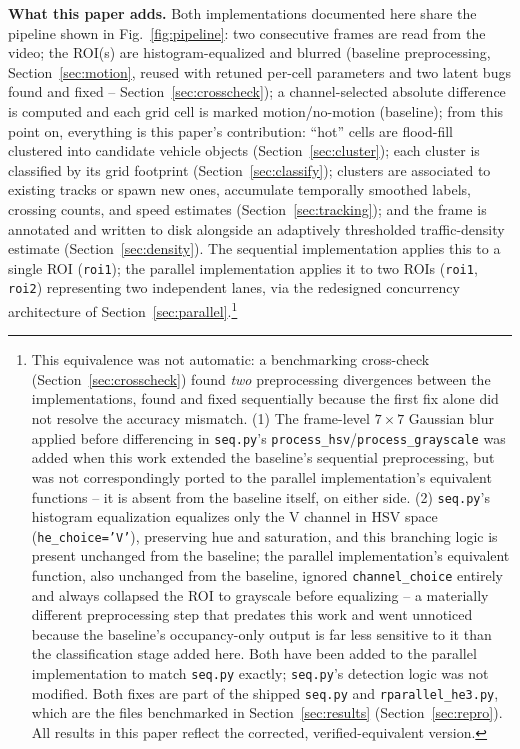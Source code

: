 \documentclass[conference]{IEEEtran}
\newcommand{\code}[1]{\texttt{#1}}
\begin{document}
\textbf{What this paper adds.} Both implementations documented here
share the pipeline shown in Fig.~\ref{fig:pipeline}: two consecutive
frames are read from the video; the ROI(s) are histogram-equalized and
blurred (baseline preprocessing, Section~\ref{sec:motion}, reused with
retuned per-cell parameters and two latent bugs found and fixed --
Section~\ref{sec:crosscheck}); a channel-selected absolute difference is
computed and each grid cell is marked motion/no-motion (baseline); from
this point on, everything is this paper's contribution: ``hot'' cells
are flood-fill clustered into candidate vehicle objects
(Section~\ref{sec:cluster}); each cluster is classified by its grid
footprint (Section~\ref{sec:classify}); clusters are associated to
existing tracks or spawn new ones, accumulate temporally smoothed
labels, crossing counts, and speed estimates (Section~\ref{sec:tracking});
and the frame is annotated and written to disk alongside an adaptively
thresholded traffic-density estimate (Section~\ref{sec:density}). The
sequential implementation applies this to a single ROI (\code{roi1});
the parallel implementation applies it to two ROIs (\code{roi1},
\code{roi2}) representing two independent lanes, via the redesigned
concurrency architecture of Section~\ref{sec:parallel}.\footnote{This
equivalence was not automatic: a benchmarking cross-check
(Section~\ref{sec:crosscheck}) found \emph{two} preprocessing
divergences between the implementations, found and fixed sequentially
because the first fix alone did not resolve the accuracy mismatch. (1)
The frame-level $7\times7$ Gaussian blur applied before differencing in
\code{seq.py}'s \code{process\_hsv}/\code{process\_grayscale} was added
when this work extended the baseline's sequential preprocessing, but
was not correspondingly ported to the parallel implementation's
equivalent functions -- it is absent from the baseline itself, on
either side. (2) \code{seq.py}'s histogram equalization equalizes only
the V channel in HSV space (\code{he\_choice='V'}), preserving hue and
saturation, and this branching logic is present unchanged from the
baseline; the parallel implementation's equivalent function, also
unchanged from the baseline, ignored \code{channel\_choice} entirely and
always collapsed the ROI to grayscale before equalizing -- a materially
different preprocessing step that predates this work and went unnoticed
because the baseline's occupancy-only output is far less sensitive to
it than the classification stage added here. Both have been added to
the parallel implementation to match \code{seq.py} exactly;
\code{seq.py}'s detection logic was not modified. Both fixes are part of
the shipped \code{seq.py} and \code{rparallel\_he3.py}, which are the
files benchmarked in Section~\ref{sec:results} (Section~\ref{sec:repro}).
All results in this paper reflect the corrected, verified-equivalent
version.}
\end{document}
